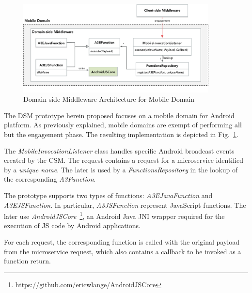 \begin{figure}[tbp]
	\includegraphics[width=0.9\textwidth]{figs/a3e-mobiledomain-prototype}
	\caption{Domain-side Middleware Architecture for Mobile Domain}
	\label{fig:mobile-domain-prototype}
\end{figure}

The DSM prototype herein proposed focuses on a mobile domain for Android platform. As previously explained, mobile domains are exempt of performing all but the engagement phase. The resulting implementation is depicted in Fig.~\ref{fig:mobile-domain-prototype}.


The \textit{MobileInvocationListener} class handles specific Android broadcast events created by the CSM.  The request contains a request for a microservice identified by a \textit{unique name}. The later is used by a \textit{FunctionsRepository} in the lookup of the corresponding \textit{A3Function}. 

The prototype supports two types of functions: \textit{A3EJavaFunction} and \textit{A3EJSFunction}. In particular, \textit{A3JSFunction} represent JavaScript functions. The later use \textit{AndroidJSCore}~\footnote{https://github.com/ericwlange/AndroidJSCore}, an Android Java JNI wrapper required for the execution of JS code by Android applications.

For each request, the corresponding function is called with the original payload from the microservice request, which also contains a callback to be invoked as a function return.


